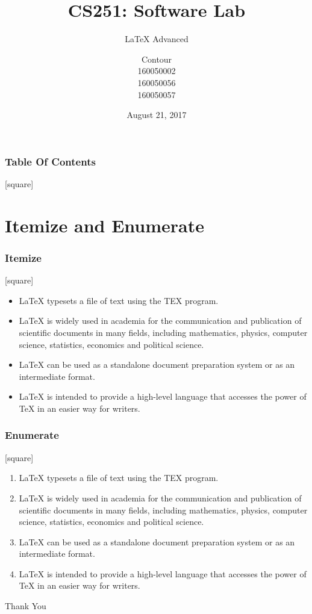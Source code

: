 \documentclass{beamer}
\title[SSL]{CS251: Software Lab}
\subtitle{{\LaTeX} Advanced}
\author[Contour]{Contour \\160050002 \\160050056 \\160050057}
\institute[IIT]{Indian Institute of Technology,Bombay}
\date{ August 21, 2017}
\begin{document}
{
	\frame{\titlepage}

	\begin{frame}
		\frametitle{Table Of Contents}
		[square]
		\tableofcontents
	\end{frame}
}

\section{Itemize and Enumerate}

\begin{frame}
	\frametitle{Itemize}
	[square]
	\begin{itemize}
		\item {\LaTeX} typesets a file of text using the TEX program.
		\item {\LaTeX} is widely used in academia for the communication and publication of scientific documents in many fields, including mathematics, physics, computer science, statistics, economics and political science.
		\item {\LaTeX} can be used as a standalone document preparation system or as an intermediate format.
		\item {\LaTeX} is intended to provide a high-level language that
accesses the power of TeX in an easier way for writers.
	\end{itemize}
\end{frame}

\begin{frame}
	\frametitle{Enumerate}
	[square]
	\begin{enumerate}
		\item {\LaTeX} typesets a file of text using the TEX program.
		\item {\LaTeX} is widely used in academia for the communication and publication of scientific documents in many fields, including mathematics, physics, computer science, statistics, economics and political science.
		\item {\LaTeX} can be used as a standalone document preparation system or as an intermediate format.
		\item {\LaTeX} is intended to provide a high-level language that
accesses the power of TeX in an easier way for writers.
	\end{enumerate}
\end{frame}

\begin{frame}
	\begin{center}
		\huge {Thank You}
	\end{center}
\end{frame}
\end{document}
